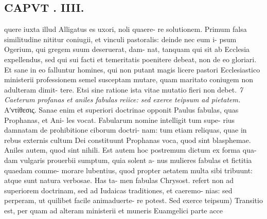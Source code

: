 \documentclass{article}
\begin{document}
\begin{pages}
\section*{CAPVT . IIII. }
\marginpar{[ p.293 ]}quere iuxta illud Alligatus es uxori, noli quaere- re solutionem. Primum falsa similitudine nititur coniugii, et vinculi pastoralis: deinde nec eum i- psum Ogerium, qui gregem suum deseruerat, dam- nat, tanquam qui sit ab Ecclesia expellendus, sed qui sui facti et temeritatis poenitere debeat, non de eo gloriari. Et sane in eo falluntur homines, qui non putant magis licere pastori Ecclesiastico ministerii professionem semel susceptam mutare, quam maritato coniugem non adulteram dimit- tere. Etsi sine ratione ista vitae mutatio fieri non debet. \textit{7 Caeterum profanas et aniles fabulas} \textit{reiice: sed exerce teipsum ad pietatem.} Αʹντίθεσις. Sanae enim et superiori doctrinae opponit Paulus fabulas, quas Prophanas, et Ani- les vocat. Fabularum nomine intelligit tum supe- rius damnatam de prohibitione ciborum doctri- nam: tum etiam reliquas, quae in rebus externis cultum Dei constituunt Prophanas voca, quod sint blasphemae. Aniles autem, quod sint nihili. Est autem hoc postremum dictum ex forma qua- dam vulgaris prouerbii sumptum, quia solent a- nus mulieres fabulas et fictitia quaedam comme- morare lubentius, quod propter aetatem multa sibi tribuunt: atque sunt natura verbosae. Has ta- men fabulas Chrysost. refert non ad superiorem doctrinam, sed ad Iudaicas traditiones, et caeremo- nias: sed perperam, ut quilibet facile animaduerte- re potest. Sed exerce teipsum) Transitio est, per quam ad alteram ministerii et muneris Euamgelici parte acce 

\end{pages}
\end{document}
